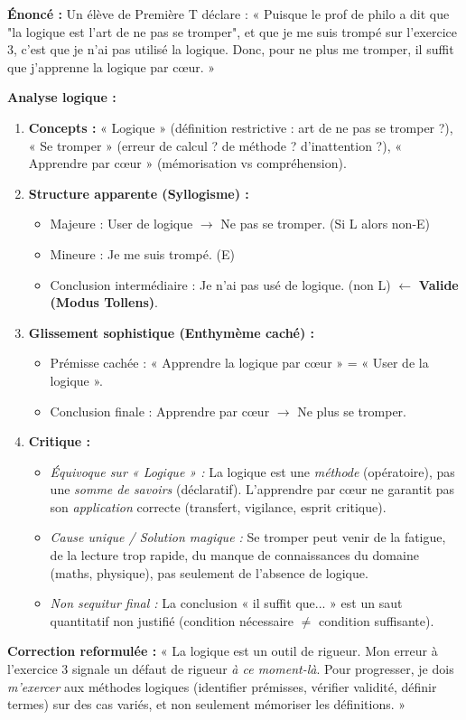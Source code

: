 \documentclass[11pt]{article}
\begin{document}
\begin{exoresolu}
\textbf{Énoncé :} Un élève de Première T déclare : « Puisque le prof de philo a dit que "la logique est l'art de ne pas se tromper", et que je me suis trompé sur l'exercice 3, c'est que je n'ai pas utilisé la logique. Donc, pour ne plus me tromper, il suffit que j'apprenne la logique par cœur. »

\textbf{Analyse logique :}
\begin{enumerate}
    \item \textbf{Concepts :} « Logique » (définition restrictive : art de ne pas se tromper ?), « Se tromper » (erreur de calcul ? de méthode ? d'inattention ?), « Apprendre par cœur » (mémorisation vs compréhension).
    \item \textbf{Structure apparente (Syllogisme) :}
    \begin{itemize}
        \item Majeure : User de logique $\rightarrow$ Ne pas se tromper. (Si L alors non-E)
        \item Mineure : Je me suis trompé. (E)
        \item Conclusion intermédiaire : Je n'ai pas usé de logique. (non L) $\leftarrow$ \textbf{Valide (Modus Tollens)}.
    \end{itemize}
    \item \textbf{Glissement sophistique (Enthymème caché) :}
    \begin{itemize}
        \item Prémisse cachée : « Apprendre la logique par cœur » = « User de la logique ».
        \item Conclusion finale : Apprendre par cœur $\rightarrow$ Ne plus se tromper.
    \end{itemize}
    \item \textbf{Critique :}
    \begin{itemize}
        \item \textit{Équivoque sur « Logique » :} La logique est une \emph{méthode} (opératoire), pas une \emph{somme de savoirs} (déclaratif). L'apprendre par cœur ne garantit pas son \emph{application} correcte (transfert, vigilance, esprit critique).
        \item \textit{Cause unique / Solution magique :} Se tromper peut venir de la fatigue, de la lecture trop rapide, du manque de connaissances du domaine (maths, physique), pas seulement de l'absence de logique.
        \item \textit{Non sequitur final :} La conclusion « il suffit que... » est un saut quantitatif non justifié (condition nécessaire $\neq$ condition suffisante).
    \end{itemize}
\end{enumerate}
\textbf{Correction reformulée :} « La logique est un outil de rigueur. Mon erreur à l'exercice 3 signale un défaut de rigueur \emph{à ce moment-là}. Pour progresser, je dois \emph{m'exercer} aux méthodes logiques (identifier prémisses, vérifier validité, définir termes) sur des cas variés, et non seulement mémoriser les définitions. »
\end{exoresolu}
\end{document}
